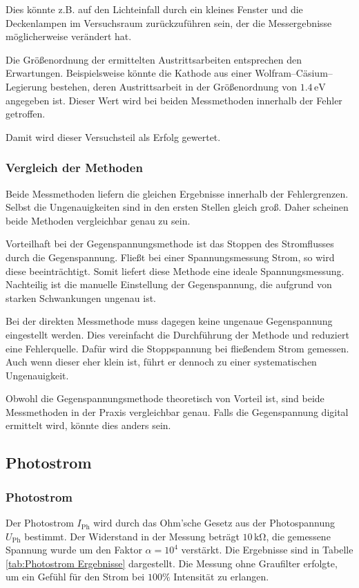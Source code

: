 \documentclass[12pt,a4paper]{scrartcl}
\numberwithin{equation}{section} %
\begin{document}
Dies könnte z.B. auf den Lichteinfall durch ein kleines Fenster und die Deckenlampen im Versuchsraum zurückzuführen sein, der die Messergebnisse möglicherweise verändert hat.

Die Größenordnung der ermittelten Austrittsarbeiten entsprechen den Erwartungen. Beispielsweise könnte die Kathode aus einer Wolfram--Cäsium--Legierung bestehen, deren Austrittsarbeit in der Größenordnung von $1.4\mathrm{\,eV}$ \cite{Demtröder} angegeben ist. Dieser Wert wird bei beiden Messmethoden innerhalb der Fehler getroffen.

Damit wird dieser Versuchsteil als Erfolg gewertet.

\subsubsection{Vergleich der Methoden}
Beide Messmethoden liefern die gleichen Ergebnisse innerhalb der Fehlergrenzen. Selbst die Ungenauigkeiten sind in den ersten Stellen gleich groß. Daher scheinen beide Methoden vergleichbar genau zu sein.

Vorteilhaft bei der Gegenspannungsmethode ist das Stoppen des Stromflusses durch die Gegenspannung. Fließt bei einer Spannungsmessung Strom, so wird diese beeinträchtigt. Somit liefert diese Methode eine ideale Spannungsmessung. Nachteilig ist die manuelle Einstellung der Gegenspannung, die aufgrund von starken Schwankungen ungenau ist.

Bei der direkten Messmethode muss dagegen keine ungenaue Gegenspannung eingestellt werden. Dies vereinfacht die Durchführung der Methode und reduziert eine Fehlerquelle. Dafür wird die Stoppspannung bei fließendem Strom gemessen. Auch wenn dieser eher klein ist, führt er dennoch zu einer systematischen Ungenauigkeit.

Obwohl die Gegenspannungsmethode theoretisch von Vorteil ist, sind beide Messmethoden in der Praxis vergleichbar genau. Falls die Gegenspannung digital ermittelt wird, könnte dies anders sein.

\subsection{Photostrom}
\subsubsection{Photostrom}

Der Photostrom $I_\mathrm{Ph}$ wird durch das Ohm'sche Gesetz aus der Photospannung $U_\mathrm{Ph}$ bestimmt. Der Widerstand in der Messung beträgt $10 \mathrm{\,k\Omega}$, die gemessene Spannung wurde um den Faktor $\alpha=10^4$ verstärkt. Die Ergebnisse sind in Tabelle \ref{tab:Photostrom Ergebnisse} dargestellt. Die Messung ohne Graufilter erfolgte, um ein Gefühl für den Strom bei $100\%$ Intensität zu erlangen.
\end{document}
